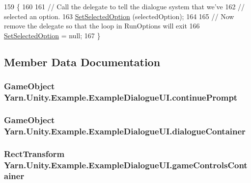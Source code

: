 \begin{DoxyCode}
159         \{
160             
161             \textcolor{comment}{// Call the delegate to tell the dialogue system that we've}
162             \textcolor{comment}{// selected an option.}
163             \hyperlink{a00053_a558f60ef9a7bcf887f015ba0d27aa6ef}{SetSelectedOption} (selectedOption);
164             
165             \textcolor{comment}{// Now remove the delegate so that the loop in RunOptions will exit}
166             \hyperlink{a00053_a558f60ef9a7bcf887f015ba0d27aa6ef}{SetSelectedOption} = null; 
167         \}
\end{DoxyCode}


\subsection{Member Data Documentation}
\hypertarget{a00053_a74367b77a6a5218fa47dbe1d6266e4c6}{
\subsubsection[{continue\-Prompt}]{\setlength{\rightskip}{0pt plus 5cm}Game\-Object Yarn.\-Unity.\-Example.\-Example\-Dialogue\-U\-I.\-continue\-Prompt}}\label{a00053_a74367b77a6a5218fa47dbe1d6266e4c6}
\hypertarget{a00053_a2eaebc844d2ca982ec078708d070dbd3}{
\subsubsection[{dialogue\-Container}]{\setlength{\rightskip}{0pt plus 5cm}Game\-Object Yarn.\-Unity.\-Example.\-Example\-Dialogue\-U\-I.\-dialogue\-Container}}\label{a00053_a2eaebc844d2ca982ec078708d070dbd3}
\hypertarget{a00053_a8344106eb22a0ad00e2400c2941b3e5f}{
\subsubsection[{game\-Controls\-Container}]{\setlength{\rightskip}{0pt plus 5cm}Rect\-Transform Yarn.\-Unity.\-Example.\-Example\-Dialogue\-U\-I.\-game\-Controls\-Container}}\label{a00053_a8344106eb22a0ad00e2400c2941b3e5f}
